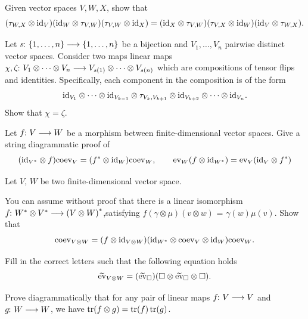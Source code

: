 \documentclass[a4paper, oneside, 12pt]{amsart}
\begin{document}
\begin{exercise}\label{exe:braid-relations}
  Given vector spaces \(V,W, X\), show that
  \begin{equation*}
    (\tau_{W,X}\otimes \mathrm{id}_{V})(\mathrm{id}_{W}\otimes \tau_{V,W})(\tau_{V,W}\otimes \mathrm{id}_{X})
    =
    (\mathrm{id}_{X}\otimes \tau_{V,W})(\tau_{V,X} \otimes \mathrm{id}_{W})(\mathrm{id}_{V}\otimes \tau_{W,X}).
  \end{equation*}

  Let \(s \from\{1, \dots , n\} \to \{1, \dots , n\}\) be a bijection and \(V_{1}, \dots , V_{n}\) pairwise distinct vector spaces.
  Consider two maps linear maps \(\chi, \zeta \from V_{1} \otimes \dots \otimes V_{n} \to V_{s(1)} \otimes \dots \otimes V_{s(n)}\) which are compositions of tensor flips and  identities.
  Specifically, each component in the composition is of the form
  \begin{equation*}
    \mathrm{id}_{V_1} \otimes \dots \otimes \mathrm{id}_{V_{k-1}} \otimes \tau_{V_k, V_{k+1}} \otimes \mathrm{id}_{V_{k+2}} \otimes \dots \otimes \mathrm{id}_{V_n}.
  \end{equation*}
  Show that  \(\chi = \zeta\).
\end{exercise}

\begin{exercise}
  Let \(f\from V\to W\) be a morphism between finite-dimensional vector spaces.
  Give a string diagrammatic proof of
  \begin{equation*}
    (\id_{\rd*{V}}\otimes f)\coev_{V} = (\rd*{f} \otimes \id_{W})\coev_{W}, \qquad
    \ev_W (f \otimes \id_{\rd*{W}}) = \ev_{V}(\id_{V}\otimes \rd*{f})
  \end{equation*}
\end{exercise}

\begin{exercise}
  Let \(V\), \(W\) be two finite-dimensional vector space.
  \begin{thmlist}
    \item You can assume without proof that there is a linear isomorphism
    \(f \from \rd*{W} \otimes \rd*{V} \to \rd*{(V\otimes W)}\),satisfying \(f(\gamma \otimes \mu) (v \otimes w) \) = \(\gamma(w)\mu(v)\).
     Show that
     \begin{equation*}
       \coev_{V\otimes W} = (f \otimes \id_{V\otimes W})(\id_{\rd*{W}} \otimes \coev_{V}\otimes \id_{W})\coev_{W}.
     \end{equation*}

    \item Fill in the correct letters such that the following equation holds
    \begin{equation*}
      \widetilde{\mathrm{ev}}_{{V\otimes W}} = (\widetilde{\mathrm{ev}}_{\square})(\square \otimes \widetilde{\mathrm{ev}}_{\square} \otimes \square).
    \end{equation*}

    \item Prove diagrammatically that for any pair of linear maps \(f\from V\to V\) and \(g \from W \to W\), we have \(\operatorname{tr}(f \otimes g) = \operatorname{tr}(f)\operatorname{tr}(g)\).
  \end{thmlist}
\end{exercise}
\end{document}
